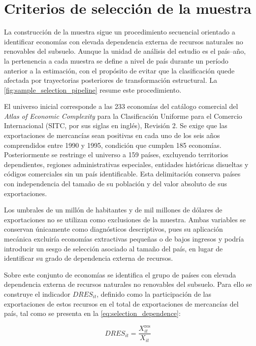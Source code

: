 \documentclass[../../TFM.tex]{subfiles}
\begin{document}
	\section{Criterios de selección de la muestra}
	\label{sec:criterios-seleccion-muestra}

	La construcción de la muestra sigue un procedimiento secuencial orientado
	a identificar economías con elevada dependencia externa de recursos
	naturales no renovables del subsuelo. Aunque la unidad de análisis del
	estudio es el país--año, la pertenencia a cada muestra se define a nivel de
	país durante un período anterior a la estimación, con el propósito de evitar
	que la clasificación quede afectada por trayectorias posteriores de
	transformación estructural. La
	\autoref{fig:sample_selection_pipeline} resume este procedimiento.

	El universo inicial corresponde a las 233 economías del catálogo comercial
	del \textit{Atlas of Economic Complexity} para la Clasificación Uniforme
	para el Comercio Internacional (SITC, por sus siglas en inglés), Revisión 2. Se exige que las exportaciones de mercancías sean positivas en cada uno
	de los seis años comprendidos entre 1990 y 1995, condición que cumplen 185
	economías. Posteriormente se restringe el universo a 159 países, excluyendo
	territorios dependientes, regiones administrativas especiales, entidades
	históricas disueltas y códigos comerciales sin un país identificable. Esta
	delimitación conserva países con independencia del tamaño de su población y
	del valor absoluto de sus exportaciones.

	Los umbrales de un millón de habitantes y de mil millones de dólares de
	exportaciones no se utilizan como exclusiones de la muestra. Ambas
	variables se conservan únicamente como diagnósticos descriptivos, pues su
	aplicación mecánica excluiría economías extractivas pequeñas o de bajos
	ingresos y podría introducir un sesgo de selección asociado al tamaño del
	país, en lugar de identificar su grado de dependencia externa de recursos.

	Sobre este conjunto de economías se identifica el grupo de países con
	elevada dependencia externa de recursos naturales no renovables del subsuelo. Para ello se construye
	el indicador $DRES_{it}$, definido como la participación de las
	exportaciones de estos recursos en el total de exportaciones de mercancías del
	país, tal como se presenta en la \autoref{eq:selection_dependence}:

	\begin{equation}
		DRES_{it} =
		\frac{X^{\text{res}}_{it}}{X_{it}}
		\label{eq:selection_dependence}
	\end{equation}
\end{document}
